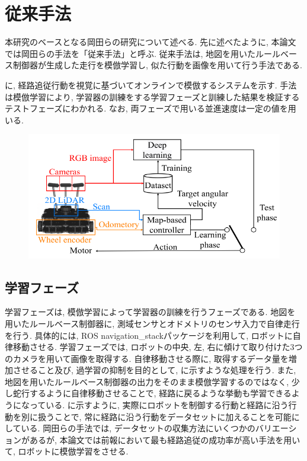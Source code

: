 
\section{従来手法}
本研究のベースとなる岡田らの研究について述べる. 先に述べたように, 本論文では岡田らの手法を「従来手法」と呼ぶ. 従来手法は, 地図を用いたルールベース制御器が生成した走行を模倣学習し, 似た行動を画像を用いて行う手法である.\par
{}に, 経路追従行動を視覚に基づいてオンラインで模倣するシステムを示す. 手法は模倣学習により, 学習器の訓練をする学習フェーズと訓練した結果を検証するテストフェーズにわかれる. なお, 両フェーズで用いる並進速度は一定の値を用いる.

\vspace{3cm}

\begin{figure}[hbtp]
  \centering
 \includegraphics[keepaspectratio, scale=0.5]
      {images/imitation_sys.png}
 \caption{}
 \label{Fig:imitation_sys}
\end{figure}

\newpage

\subsection{学習フェーズ}
学習フェーズは, 模倣学習によって学習器の訓練を行うフェーズである. 地図を用いたルールベース制御器に, 測域センサとオドメトリのセンサ入力で自律走行を行う. 具体的には, ROS navigation\_stackパッケージを利用して, ロボットに自律移動させる. 学習フェーズでは, ロボットの中央, 左, 右に傾けて取り付けた3つのカメラを用いて画像を取得する. 自律移動させる際に, 取得するデータ量を増加させること及び, 過学習の抑制を目的として, に示すような処理を行う. また, 地図を用いたルールベース制御器の出力をそのまま模倣学習するのではなく, 少し蛇行するように自律移動させることで, 経路に戻るような挙動も学習できるようになっている. に示すように, 実際にロボットを制御する行動と経路に沿う行動を別に扱うことで, 常に経路に沿う行動をデータセットに加えることを可能にしている. 
岡田らの手法では, データセットの収集方法にいくつかのバリエーションがあるが, 本論文では前報\cite{okada2}において最も経路追従の成功率が高い手法を用いて, ロボットに模倣学習をさせる.

